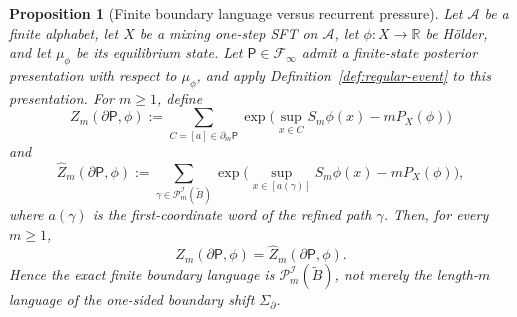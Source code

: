 \documentclass{etds}%
\numberwithin{equation}{section}
\theoremstyle{plain}
\newtheorem{proposition}[theorem]{Proposition}
\theoremstyle{definition}
\theoremstyle{remark}
\begin{document}
\begin{proposition}[Finite boundary language versus recurrent pressure]
\label{prop:finite-boundary-vs-recurrent-pressure}
Let $\mathcal{A}$ be a finite alphabet, let $X$ be a mixing one-step SFT on
$\mathcal{A}$, let $\phi:X\to\mathbb{R}$ be H\"older, and let $\mu_\phi$ be
its equilibrium state.  Let $\mathsf{P}\in\mathcal{F}_\infty$ admit a
finite-state posterior presentation with respect to $\mu_\phi$, and apply
Definition~\ref{def:regular-event} to this presentation.  For $m\ge 1$, define
\[
Z_m(\partial\mathsf{P},\phi)
:=\sum_{C=[a]\in\partial_m\mathsf{P}}
\exp\!\bigl(\sup_{x\in C}S_m\phi(x)-mP_X(\phi)\bigr)
\]
and
\[
\widehat Z_m(\partial\mathsf{P},\phi)
:=\sum_{\gamma\in\mathcal{P}_m^{\mathcal{I}}(\widetilde{B})}
\exp\!\bigl(\sup_{x\in[a(\gamma)]}S_m\phi(x)-mP_X(\phi)\bigr),
\]
where $a(\gamma)$ is the first-coordinate word of the refined path
$\gamma$.  Then, for every $m\ge 1$,
\[
Z_m(\partial\mathsf{P},\phi)=\widehat Z_m(\partial\mathsf{P},\phi).
\]
Hence the exact finite boundary language is
$\mathcal{P}_m^{\mathcal{I}}(\widetilde{B})$, not merely the length-$m$
language of the one-sided boundary shift $\Sigma_\partial$.


\end{proposition}
\end{document}
